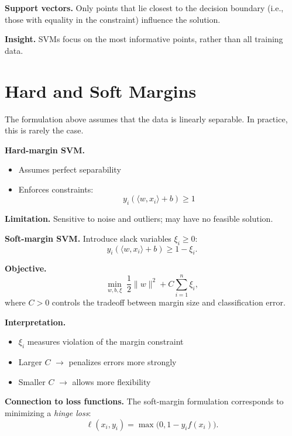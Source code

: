 \medskip

\noindent
\textbf{Support vectors.}  
Only points that lie closest to the decision boundary (i.e., those with equality in the constraint) influence the solution.

\medskip

\noindent
\textbf{Insight.}  
SVMs focus on the most informative points, rather than all training data.

\section{Hard and Soft Margins}

The formulation above assumes that the data is linearly separable. In practice, this is rarely the case.

\medskip

\noindent
\textbf{Hard-margin SVM.}
\begin{itemize}
    \item Assumes perfect separability
    \item Enforces constraints:
    \[
    y_i (\langle w, x_i \rangle + b) \geq 1
    \]
\end{itemize}

\medskip

\noindent
\textbf{Limitation.}  
Sensitive to noise and outliers; may have no feasible solution.

\medskip

\noindent
\textbf{Soft-margin SVM.}  
Introduce slack variables $\xi_i \geq 0$:
\[
y_i (\langle w, x_i \rangle + b) \geq 1 - \xi_i.
\]

\medskip

\noindent
\textbf{Objective.}
\[
\min_{w,b,\xi} \; \frac{1}{2}\|w\|^2 + C \sum_{i=1}^n \xi_i,
\]
where $C > 0$ controls the tradeoff between margin size and classification error.

\medskip

\noindent
\textbf{Interpretation.}
\begin{itemize}
    \item $\xi_i$ measures violation of the margin constraint
    \item Larger $C$ $\rightarrow$ penalizes errors more strongly
    \item Smaller $C$ $\rightarrow$ allows more flexibility
\end{itemize}

\medskip

\noindent
\textbf{Connection to loss functions.}  
The soft-margin formulation corresponds to minimizing a \emph{hinge loss}:
\[
\ell(x_i, y_i) = \max\big(0, 1 - y_i f(x_i)\big).
\]

